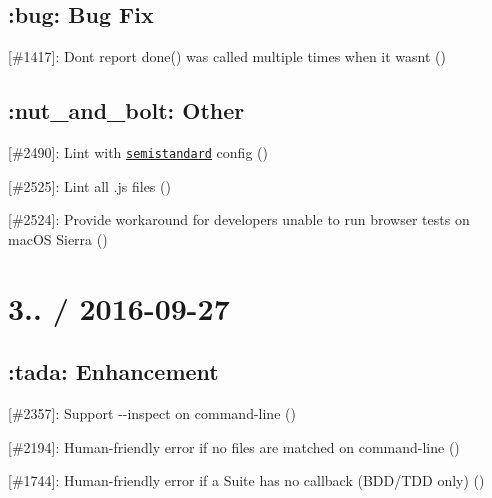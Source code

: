 \subsection*{\+:bug\+: Bug Fix}


\begin{DoxyItemize}
\item \mbox{[}\#1417\mbox{]}\+: Don\textquotesingle{}t report {\ttfamily done()} was called multiple times when it wasn\textquotesingle{}t (\href{https://github.com/frankleonrose}{\tt })
\end{DoxyItemize}

\subsection*{\+:nut\+\_\+and\+\_\+bolt\+: Other}


\begin{DoxyItemize}
\item \mbox{[}\#2490\mbox{]}\+: Lint with \href{https://npmjs.com/package/semistandard}{\tt semistandard} config (\href{https://github.com/makepanic}{\tt })
\item \mbox{[}\#2525\mbox{]}\+: Lint all {\ttfamily .js} files (\href{https://github.com/boneskull}{\tt })
\item \mbox{[}\#2524\mbox{]}\+: Provide workaround for developers unable to run browser tests on mac\+OS Sierra (\href{https://github.com/boneskull}{\tt })
\end{DoxyItemize}

\section*{3.. / 2016-\/09-\/27}

\subsection*{\+:tada\+: Enhancement}


\begin{DoxyItemize}
\item \mbox{[}\#2357\mbox{]}\+: Support {\ttfamily -\/-\/inspect} on command-\/line (\href{https://github.com/simov}{\tt })
\item \mbox{[}\#2194\mbox{]}\+: Human-\/friendly error if no files are matched on command-\/line (\href{https://github.com/munter}{\tt })
\item \mbox{[}\#1744\mbox{]}\+: Human-\/friendly error if a Suite has no callback (B\+D\+D/\+T\+DD only) (\href{https://github.com/anton}{\tt })
\end{DoxyItemize}

